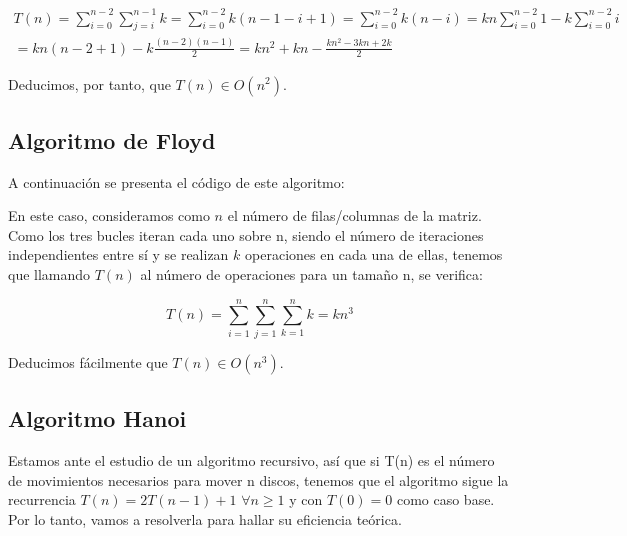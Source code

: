 \documentclass{homework}
\begin{document}
    \begin{equation*}
        \begin{split}
            T(n) = \sum_{i=0}^{n-2} \sum_{j=i}^{n-1} k = \sum_{i=0}^{n-2} k(n-1-i+1) = \sum_{i=0}^{n-2} k(n-i) = kn \sum_{i=0}^{n-2} 1  - k \sum_{i=0}^{n-2} i \\
            = kn(n-2+1) - k \frac{(n-2)(n-1)}{2} = kn^2 + kn - \frac{kn^2 - 3kn + 2k}{2}
        \end{split}
    \end{equation*}
    
    Deducimos, por tanto, que $T(n) \in O(n^2)$. 
    
    \subsection{Algoritmo de Floyd}

    A continuación se presenta el código de este algoritmo:

    

    En este caso, consideramos como $n$ el número de filas/columnas de la matriz. Como los tres bucles iteran cada uno sobre n, siendo el número de iteraciones
    independientes entre sí y se realizan $k$ operaciones en cada una de ellas, tenemos que llamando $T(n)$ al número de operaciones para un tamaño n, se verifica:
    
    \begin{equation*}
        T(n) = \sum_{i=1}^n \sum_{j=1}^{n} \sum_{k=1}^{n} k = kn^3
    \end{equation*}

    Deducimos fácilmente que $T(n) \in O(n^3)$. 
    
    \subsection{Algoritmo Hanoi}
    
     

    Estamos ante el estudio de un algoritmo recursivo, así que si T(n) es el número de movimientos necesarios para mover n discos, tenemos que el algoritmo sigue la 
    recurrencia $T(n) = 2T(n-1) + 1$ $\forall n \geq 1$ y con $T(0) = 0$ como caso base. Por lo tanto, vamos a resolverla para hallar su eficiencia teórica.
\end{document}
